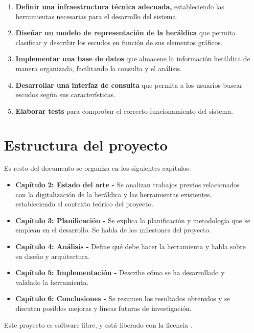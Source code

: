 \begin{enumerate}
    \item \textbf{Definir una infraestructura técnica adecuada,} estableciendo las herramientas
    necesarias para el desarrollo del sistema.
    \item \textbf{Diseñar un modelo de representación de la heráldica} que permita clasificar y 
    describir los escudos en función de sus elementos gráficos.
    \item \textbf{Implementar una base de datos} que almacene la información heráldica de manera
    organizada, facilitando la consulta y el análisis.
    \item \textbf{Desarrollar una interfaz de consulta} que permita a los usuarios buscar escudos
    según sus características.
    \item \textbf{Elaborar tests} para comprobar el correcto funcionamiento del sistema.
\end{enumerate}

\section{Estructura del proyecto}
Es resto del documento se organiza en los siguientes capítulos:

\begin{itemize}
    \item \textbf{Capítulo 2: Estado del arte -} Se analizan trabajos previos relacionados
    con la digitalización de la heráldica y las herramientas existentes, estableciendo
    el contexto teórico del proyecto.
    \item \textbf{Capítulo 3: Planificación - } Se explica la planificación y metodología
    que se emplean en el desarrollo. Se habla de los milestones del proyecto.
    \item \textbf{Capítulo 4: Análisis - } Define qué debe hacer la herramienta y habla
    sobre su diseño y arquitectura.
    \item \textbf{Capítulo 5: Implementación - }Describe cómo se ha desarrollado y validado
    la herramienta. 
    \item \textbf{Capítulo 6: Conclusiones - } Se resumen los resultados obtenidos y se
    discuten posibles mejoras y líneas futuras de investigación.
\end{itemize}

Este proyecto es software libre, y está liberado con la licencia \cite{gplv3}.